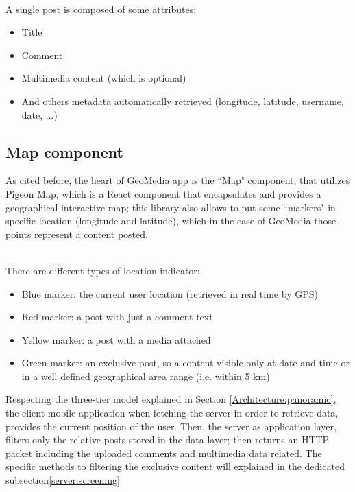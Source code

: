 \documentclass[conference]{IEEEtran}
\begin{document}
\\
A single post is composed of some attributes:
\begin{itemize}
    \item Title
    \item Comment
    \item Multimedia content (which is optional)
    \item And others metadata automatically retrieved (longitude, latitude, username, date, ...)
\end{itemize}

\subsection{Map component}

As cited before, the heart of GeoMedia app is the ``Map" component, that utilizes Pigeon Map\cite{b8}, which is a React component that encapsulates and provides a geographical interactive map; this library also allows to put some ``markers" in specific location (longitude and latitude), which in the case of GeoMedia those points represent a content posted.

\\

There are different types of location indicator:
\begin{itemize}
\item Blue marker: the current user location (retrieved in real time by GPS)
\item Red marker: a post with just a comment text
\item Yellow marker: a post with a media attached
\item Green marker: an exclusive post, so a content visible only at date and time or in a well defined geographical area range (i.e. within 5 km)
\end{itemize}

Respecting the three-tier model explained in Section \ref{Architecture:panoramic}, the client mobile application when fetching the server in order to retrieve data, provides the current position of the user. Then, the server as application layer, filters only the relative posts stored in the data layer; then returns an HTTP packet including the uploaded comments and multimedia data related.
The specific methods to filtering the exclusive content will explained in the dedicated subsection\ref{server:screening}
\end{document}
